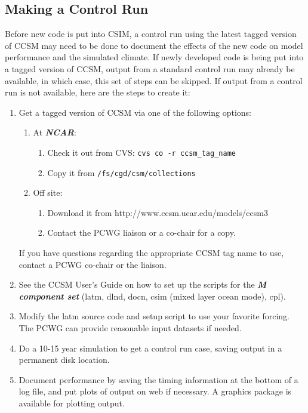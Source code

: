 \subsection{Making a Control Run}
\label{control_run}

Before new code is put into CSIM, a control run using the latest tagged
version of CCSM may need to be done to document the effects of the new
code on model performance and the simulated climate.  If newly
developed code is being put into a tagged version of CCSM, output from a
standard control run may already be available, in which case, this
set of steps can be skipped.  If output from a control run is not available,
here are the steps to create it:

\begin{enumerate}

  \item  Get a tagged version of CCSM via one of the following options:
    \begin{enumerate}
      \item  At {\bf \textsl{NCAR}}:
        \begin{enumerate}
          \item Check it out from CVS: {\tt cvs co -r ccsm\_tag\_name} 
          \item Copy it from {\tt /fs/cgd/csm/collections}
        \end{enumerate}
      \item  Off site:
        \begin{enumerate}
          \item Download it from http://www.ccsm.ucar.edu/models/ccsm3
          \item Contact the PCWG liaison or a co-chair for a copy.
        \end{enumerate}
    \end{enumerate}
  If you have questions regarding the appropriate CCSM tag name to use,
  contact a PCWG co-chair or the liaison.

  \item  See the CCSM User's Guide on how to set up the scripts for the 
         {\bf \textsl{M component set}} (latm, dlnd, docn, csim (mixed layer
         ocean mode), cpl).

  \item  Modify the latm source code and setup script to use your favorite
         forcing.  The PCWG can provide reasonable input datasets if needed.

  \item  Do a 10-15 year simulation to get a control run case, saving output
         in a permanent disk location.

  \item  Document performance by saving the timing information at the bottom of
         a log file, and put plots of output on web if necessary.  A graphics
         package is available for plotting output.

\end{enumerate}

